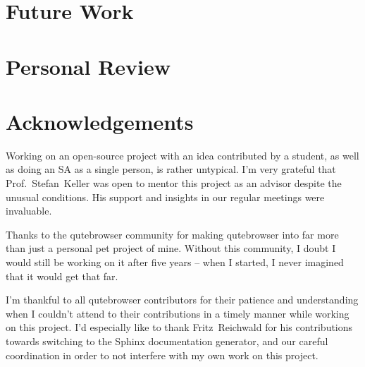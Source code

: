 \documentclass[a4paper,parskip=full]{scrreprt}
\begin{document}
\section{Future Work}

% 
% 
% 



\section{Personal Review}

\section{Acknowledgements}
Working on an open-source project with an idea contributed by a student, as well
as doing an SA as a single person, is rather untypical. I'm very grateful that
Prof.~Stefan~Keller was open to mentor this project as an advisor despite the
unusual conditions. His support and insights in our regular meetings were
invaluable.

Thanks to the qutebrowser community for making qutebrowser into far more than
just a personal pet project of mine. Without this community, I doubt I would
still be working on it after five years -- when I started, I never imagined that
it would get that far.

I'm thankful to all qutebrowser contributors for their patience and
understanding when I couldn't attend to their contributions in a timely manner
while working on this project. I'd especially like to thank Fritz~Reichwald for
his contributions towards switching to the Sphinx documentation generator, and
our careful coordination in order to not interfere with my own work on this
project.
\end{document}
